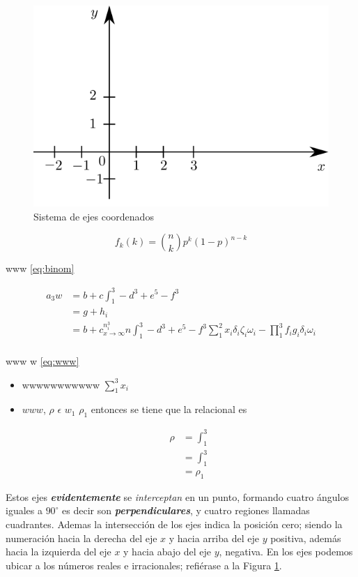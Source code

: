 \documentclass[
  16pt,
]{krantz}
\theoremstyle{definition}
\theoremstyle{definition}
\theoremstyle{definition}
\theoremstyle{definition}
\theoremstyle{remark}
\begin{document}
\begin{figure}[!ht]

{\centering \includegraphics{ejes} 

}

\caption{Sistema de ejes coordenados}\label{fig:2d}
\end{figure}

\[
  f_k\left(k\right) = \binom{n}{k} p^k\left(1-p\right)^{n-k}
  \label{eq:binom}
\]

www \eqref{eq:binom}

\[
\begin{split}
a_3w&=b+c\int_1^3-d^3+e^5-f^3\\
&=g+h_i\\
& =b+c_{x\to\infty}^{n_i^3}n\int_1^3-d^3+e^5-f^3\sum_1^2x_i\delta_i\zeta_i\omega_i-\prod_1^3f_ig_i\delta_i\omega_i\\
\end{split} 
\label{eq:align}\]

www w \eqref{eq:www}

\begin{itemize}
\item
  wwwwwwwwwww \(\sum_1^3x_i\)
\item
  \(www\), \(\rho\) \(\epsilon\) \(w_1\) \(\rho_1\) entonces se tiene que la relacional es

  \[
  \begin{split}
  \rho&=\int_1^3\\
  &=\int_1^3\\
  &=\rho_1
  \end{split} \label{eq:www}
  \]
\end{itemize}

Estos ejes \textbf{\emph{evidentemente}} se \emph{interceptan} en un punto, formando cuatro ángulos iguales a \(90^\circ\) es decir son \textbf{\emph{perpendiculares}}, y cuatro regiones llamadas cuadrantes. Ademas la intersección de los ejes indica la posición cero; siendo la numeración hacia la derecha del eje \(x\) y hacia arriba del eje \(y\) positiva, además hacia la izquierda del eje \(x\) y hacia abajo del eje \(y\), negativa. En los ejes podemos ubicar a los números reales e irracionales; refiérase a la Figura \ref{fig:2d}.
\end{document}
